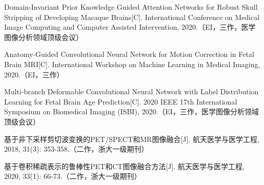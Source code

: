 \noindent [11] Domain-Invariant Prior Knowledge Guided Attention Networks for Robust Skull Stripping of Developing Macaque Brains[C]. International Conference on Medical Image Computing and Computer Assisted Intervention, 2020.（EI，三作，医学图像分析领域顶级会议）

\noindent [12] Anatomy-Guided Convolutional Neural Network for Motion Correction in Fetal Brain MRI[C]. International Workshop on Machine Learning in Medical Imaging, 2020.（EI，三作）

\noindent [13] Multi-branch Deformable Convolutional Neural Network with Label Distribution Learning for Fetal Brain Age Prediction[C]. 2020 IEEE 17th International Symposium on Biomedical Imaging (ISBI), 2020.（EI，三作，医学图像分析领域顶级会议）

\noindent [14] 基于非下采样剪切波变换的PET/SPECT和MR图像融合[J]. 航天医学与医学工程, 2018, 31(3): 353-358.（二作，浙大一级期刊）

\noindent [15] 基于卷积稀疏表示的鲁棒性PET和CT图像融合方法[J]. 航天医学与医学工程, 2020, 33(1): 66-73.（二作，浙大一级期刊）